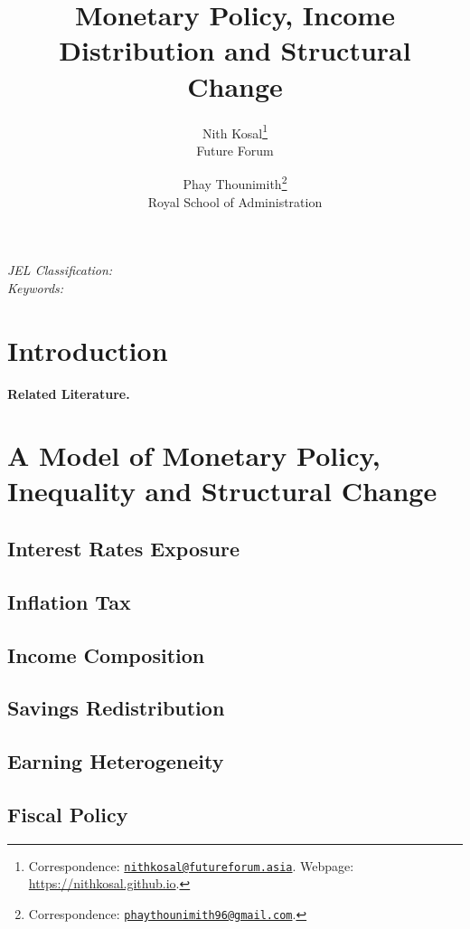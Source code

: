 \documentclass[11pt,letterpaper]{article}
\author{Nith Kosal\footnote{Correspondence: \href{mailto:nithkosal@futureforum.asia}{\texttt{nithkosal@futureforum.asia}}. Webpage: \url{https://nithkosal.github.io}.} \\
	
	\small{Future Forum}  
	
	\and
	
	Phay Thounimith\footnote{Correspondence: \href{mailto:phaythounimith96@gmail.com }{\texttt{phaythounimith96@gmail.com}}.}  \\
	
	\small{Royal School of Administration}  
	
}
\title{Monetary Policy, Income Distribution and Structural Change}
\begin{document}
	
	
	 
\maketitle
	\begin{abstract}
		    
	\end{abstract}
	\textit{JEL Classification:} \\
	\textit{Keywords:}
	
	\clearpage
\section{Introduction}\label{sec:intro}


\textbf{Related Literature. }
\section{A Model of Monetary Policy, Inequality and Structural Change}\label{sec:model}

\subsection{Interest Rates Exposure}
\subsection{Inflation Tax}
\subsection{Income Composition}
\subsection{Savings Redistribution}
\subsection{Earning Heterogeneity}
\subsection{Fiscal Policy} 
\end{document}
